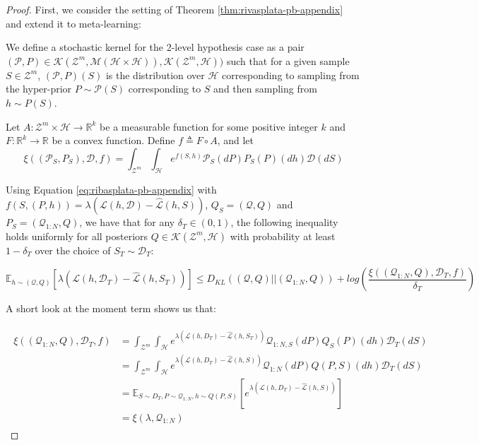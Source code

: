 \documentclass{article}
\theoremstyle{definition}
\newcommand{\Expect}[2]{\mathbb{E}_{#1}\left [#2 \right ]}
\begin{document}
\begin{proof}
	First, we consider the setting of Theorem \ref{thm:rivasplata-pb-appendix} and extend it to meta-learning:
	
	We define a stochastic kernel for the 2-level hypothesis case as a pair $(\mathcal{P},P)\in \mathcal{K}(\mathcal{Z}^m, \mathcal{M}(\mathcal{H}\times \mathcal{H})), \mathcal{K}(\mathcal{Z}^m, \mathcal{H}))$ such that for a given sample $S\in \mathcal{Z}^m$,  $(\mathcal{P},P)(S)$ is the distribution over $\mathcal{H}$ corresponding to sampling from the hyper-prior $P\sim \mathcal{P}(S)$ corresponding to $S$ and then sampling from $h\sim P(S)$.
	
	Let $A: \mathcal{Z}^m\times \mathcal{H}\rightarrow \mathbb{R}^k$ be a measurable function for some positive integer $k$ and $F:\mathbb{R}^k\rightarrow \mathbb{R}$ be a convex function.
	Define $f\triangleq F\circ A$, and let 
	$$\xi((\mathcal{P}_S,P_S), \mathcal{D}, f)=\int_{\mathcal{Z}^m}\int_{\mathcal{H}}e^{f(S, h)}\mathcal{P}_S(dP)P_S(P)(dh)\mathcal{D}(dS)$$
	
	
	Using Equation \ref{eq:ribasplata-pb-appendix} with $f(S,(P,h))=\lambda(\mathcal{L}(h,\mathcal{D})-\hat{\mathcal{L}}(h,S))$, $Q_S=(\mathcal{Q}, Q)$ and $P_S=(\mathcal{Q}_{1:N}, Q)$,
	we have that for any $\delta_T \in (0,1)$, the following inequality holds uniformly for all posteriors $Q\in \mathcal{K}(\mathcal{Z}^m, \mathcal{H})$ with probability at least $1-\delta_T$ over the choice of $S_T\sim \mathcal{D}_T$:
	
	\begin{equation} \label{eq:appendix-proof-eq}
	\Expect{h\sim (\mathcal{Q}, Q)}{\lambda(\mathcal{L}(h,\mathcal{D}_T)-\hat{\mathcal{L}}(h,S_T))} \leq D_{KL}((\mathcal{Q}, Q)||(\mathcal{Q}_{1:N}, Q))+log\left (\frac{\xi((\mathcal{Q}_{1:N}, Q), \mathcal{D}_T, f)}{\delta_T}\right )
	\end{equation}
	
	A short look at the moment term shows us that: 
	
	\begin{align*}
	\begin{split}
		\xi((\mathcal{Q}_{1:N},Q),\mathcal{D}_T,f)
		&=\int_{\mathcal{Z}^m}\int_{\mathcal{H}}e^{\lambda\left (\mathcal{L}(h, D_T)-\hat{\mathcal{L}}(h, S_T)\right )}\mathcal{Q}_{1:N,S}(dP)Q_S(P)(dh)\mathcal{D}_T(dS)\\
		&=\int_{\mathcal{Z}^m}\int_{\mathcal{H}}e^{\lambda\left (\mathcal{L}(h, D_T)-\hat{\mathcal{L}}(h, S)\right )}\mathcal{Q}_{1:N}(dP)Q(P,S)(dh)\mathcal{D}_T(dS)\\
		&=\Expect{S\sim D_T, P\sim \mathcal{Q}_{1:N}, h\sim Q(P,S)}{e^{\lambda\left (\mathcal{L}(h, D_T)-\hat{\mathcal{L}}(h, S)\right )}}\\
		&=\xi(\lambda,\mathcal{Q}_{1:N})
	\end{split}
	\end{align*}
	

\end{proof}
\end{document}
